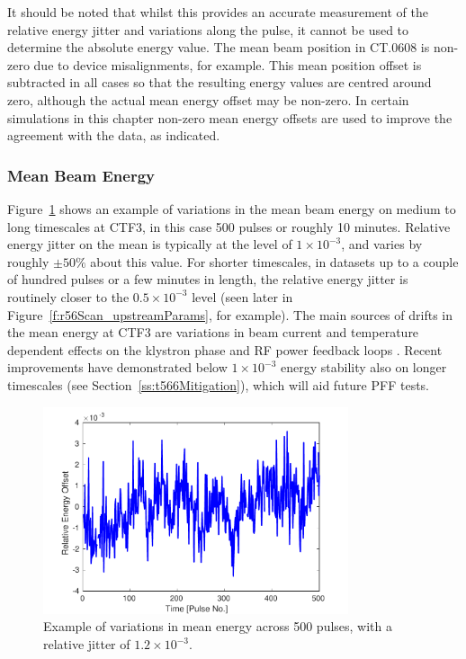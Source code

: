 It should be noted that whilst this provides an accurate measurement of the relative energy jitter and variations along the pulse, it cannot be used to determine the absolute energy value. The mean beam position in CT.0608 is non-zero due to device misalignments, for example. This mean position offset is subtracted in all cases so that the resulting energy values are centred around zero, although the actual mean energy offset may be non-zero. In certain simulations in this chapter non-zero mean energy offsets are used to improve the agreement with the data, as indicated.

\subsubsection{Mean Beam Energy}

Figure~\ref{f:enJitter_mean} shows an example of variations in the mean beam energy on medium to long timescales at CTF3, in this case 500 pulses or roughly 10 minutes. Relative energy jitter on the mean is typically at the level of \(1 \times 10^{-3}\), and varies by roughly \(\pm50\%\) about this value. For shorter timescales, in datasets up to a couple of hundred pulses or a few minutes in length, the relative energy jitter is routinely closer to the \(0.5 \times 10^{-3}\) level (seen later in Figure~\ref{f:r56Scan_upstreamParams}, for example). The main sources of drifts in the mean energy at CTF3 are variations in beam current and temperature dependent effects on the klystron phase and RF power feedback loops \cite{lukasIPAC16}. Recent improvements have demonstrated below \(1 \times 10^{-3}\) energy stability also on longer timescales (see Section~\ref{ss:t566Mitigation}), which will aid future PFF tests.

\begin{figure}
  \centering
  \includegraphics[width=0.8\textwidth]{Figures/propagation/enJitter_mean}
  \caption{Example of variations in mean energy across 500 pulses, with a relative jitter of \(1.2\times 10^{-3}\).}
  \label{f:enJitter_mean}
\end{figure}

